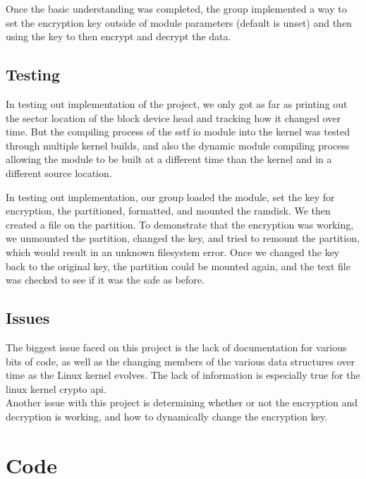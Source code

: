 \documentclass[letterpaper,10pt,titlepage]{article}
\begin{document}
Once the basic understanding was completed, the group implemented a way to set the encryption key outside of module parameters (default is unset) and then using the key to then encrypt and decrypt the data.

\subsection*{Testing} 

In testing out implementation of the project, we only got as far as printing out the sector location of the block device head and tracking how it changed over time. But the compiling process of the sstf io module into the kernel was tested through multiple kernel builds, and also the dynamic module compiling process allowing the module to be built at a different time than the kernel and in a different source location.

In testing out implementation, our group loaded the module, set the key for encryption, the partitioned, formatted, and mounted the ramdisk. We then created a file on the partition. To demonstrate that the encryption was working, we unmounted the partition, changed the key, and tried to remount the partition, which would result in an unknown filesystem error. Once we changed the key back to the original key, the partition could be mounted again, and the text file was checked to see if it was the safe as before. 

\subsection*{Issues}

The biggest issue faced on this project is the lack of documentation for various bits of code, as well as the changing members of the various data structures over time as the Linux kernel evolves. The lack of information is especially true for the linux kernel crypto api.\\

Another issue with this project is determining whether or not the encryption and decryption is working, and how to dynamically change the encryption key.\\

\section{Code}
\label{Implementation Specific Code}

\end{document}
